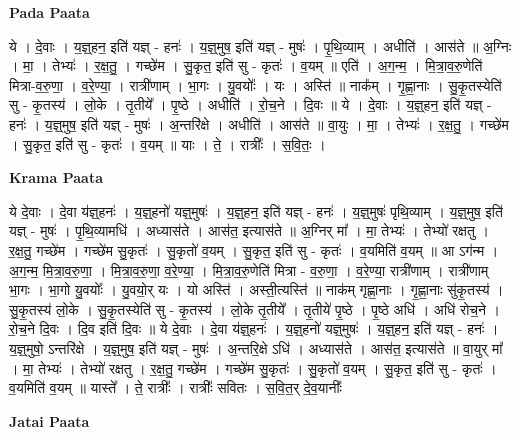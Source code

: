 \documentclass[17pt]{extarticle}
\begin{document}
\textbf{Pada Paata} \newline

ये । दे॒वाः । य॒ज्ञ्॒हन॒ इति॑ यज्ञ् - हनः॑ । य॒ज्ञ्॒मुष॒ इति॑ यज्ञ् - मुषः॑ । पृ॒थि॒व्याम् । अधीति॑ । आस॑ते ॥ अ॒ग्निः । मा॒ । तेभ्यः॑ । र॒क्ष॒तु॒ । गच्छे॑म । सु॒कृत॒ इति॑ सु - कृतः॑ । व॒यम् ॥ एति॑ । अ॒ग॒न्म॒ । मि॒त्रा॒व॒रु॒णेति॑ मित्रा-व॒रु॒णा॒ । व॒रे॒ण्या॒ । रात्री॑णाम् । भा॒गः । यु॒वयोः᳚ । यः । अस्ति॑ ॥ नाक᳚म् । गृ॒ह्णा॒नाः । सु॒कृ॒तस्येति॑ सु - कृ॒तस्य॑ । लो॒के । तृ॒तीये᳚ । पृ॒ष्ठे । अधीति॑ । रो॒च॒ने । दि॒वः ॥ ये । दे॒वाः । य॒ज्ञ्॒हन॒ इति॑ यज्ञ् - हनः॑ । य॒ज्ञ्॒मुष॒ इति॑ यज्ञ् - मुषः॑ । अ॒न्तरि॑क्षे । अधीति॑ । आस॑ते ॥ वा॒युः । मा॒ । तेभ्यः॑ । र॒क्ष॒तु॒ । गच्छे॑म । सु॒कृत॒ इति॑ सु - कृतः॑ । व॒यम् ॥ याः । ते॒ । रात्रीः᳚ । स॒वि॒तः॒ ।  \newline


\textbf{Krama Paata} \newline

ये दे॒वाः । दे॒वा य॑ज्ञ्॒हनः॑ । य॒ज्ञ्॒हनो॑ यज्ञ्॒मुषः॑ । य॒ज्ञ्॒हन॒ इति॑ यज्ञ् - हनः॑ । य॒ज्ञ्॒मुषः॑ पृथि॒व्याम् । य॒ज्ञ्॒मुष॒ इति॑ यज्ञ् - मुषः॑ । पृ॒थि॒व्यामधि॑ । अध्यास॑ते । आस॑त॒ इत्यास॑ते ॥ अ॒ग्निर् मा᳚ । मा॒ तेभ्यः॑ । तेभ्यो॑ रक्षतु । र॒क्ष॒तु॒ गच्छे॑म । गच्छे॑म सु॒कृतः॑ । सु॒कृतो॑ व॒यम् । सु॒कृत॒ इति॑ सु - कृतः॑ । व॒यमिति॑ व॒यम् ॥ आ ऽग॑न्म । अ॒ग॒न्म॒ मि॒त्रा॒व॒रु॒णा॒ । मि॒त्रा॒व॒रु॒णा॒ व॒रे॒ण्या॒ । मि॒त्रा॒व॒रु॒णेति॑ मित्रा - व॒रु॒णा॒ । व॒रे॒ण्या॒ रात्री॑णाम् । रात्री॑णाम् भा॒गः । भा॒गो यु॒वयोः᳚ । यु॒वयो॒र् यः । यो अस्ति॑ । अस्ती॒त्यस्ति॑ ॥ नाक॑म् गृह्णा॒नाः । गृ॒ह्णा॒नाः सु॑कृ॒तस्य॑ । सु॒कृ॒तस्य॑ लो॒के । सु॒कृ॒तस्येति॑ सु - कृ॒तस्य॑ । लो॒के तृ॒तीये᳚ । तृ॒तीये॑ पृ॒ष्ठे । पृ॒ष्ठे अधि॑ । अधि॑ रोच॒ने । रो॒च॒ने दि॒वः । दि॒व इति॑ दि॒वः ॥ ये दे॒वाः । दे॒वा य॑ज्ञ्॒हनः॑ । य॒ज्ञ्॒हनो॑ यज्ञ्॒मुषः॑ । य॒ज्ञ्॒हन॒ इति॑ यज्ञ् - हनः॑ । य॒ज्ञ्॒मुषो॒ ऽन्तरि॑क्षे । य॒ज्ञ्॒मुष॒ इति॑ यज्ञ् - मुषः॑ । अ॒न्तरि॒क्षे ऽधि॑ । अध्यास॑ते । आस॑त॒ इत्यास॑ते ॥ वा॒युर् मा᳚ । मा॒ तेभ्यः॑ । तेभ्यो॑ रक्षतु । र॒क्ष॒तु॒ गच्छे॑म । गच्छे॑म सु॒कृतः॑ । सु॒कृतो॑ व॒यम् । सु॒कृत॒ इति॑ सु - कृतः॑ । व॒यमिति॑ व॒यम् ॥ यास्ते᳚ । ते॒ रात्रीः᳚ । रात्रीः᳚ सवितः । स॒वि॒त॒र् दे॒व॒यानीः᳚ \newline

\textbf{Jatai Paata} \newline
\end{document}
